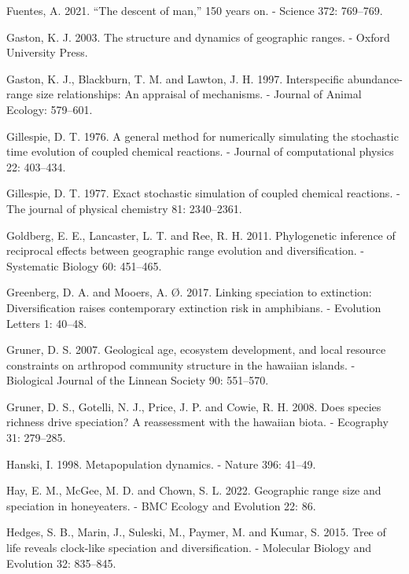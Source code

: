 \documentclass[
  letterpaper,
  DIV=11,
  numbers=noendperiod]{scrartcl}
\newlength{\cslhangindent}
\newenvironment{CSLReferences}[2] %
 {\begin{list}{}{%
  \setlength{\itemindent}{0pt}
  \setlength{\leftmargin}{0pt}
  \setlength{\parsep}{0pt}
  \ifodd #1
   \setlength{\leftmargin}{\cslhangindent}
   \setlength{\itemindent}{-1\cslhangindent}
  \fi
  \setlength{\itemsep}{#2\baselineskip}}}
 {\end{list}}
\begin{document}
\begin{CSLReferences}{1}{1}
Fuentes, A. 2021. {``The descent of man,''} 150 years on. - Science 372:
769--769.

Gaston, K. J. 2003. The structure and dynamics of geographic ranges. -
Oxford University Press.

Gaston, K. J., Blackburn, T. M. and Lawton, J. H. 1997. Interspecific
abundance-range size relationships: An appraisal of mechanisms. -
Journal of Animal Ecology: 579--601.

Gillespie, D. T. 1976. A general method for numerically simulating the
stochastic time evolution of coupled chemical reactions. - Journal of
computational physics 22: 403--434.

Gillespie, D. T. 1977. Exact stochastic simulation of coupled chemical
reactions. - The journal of physical chemistry 81: 2340--2361.

Goldberg, E. E., Lancaster, L. T. and Ree, R. H. 2011. Phylogenetic
inference of reciprocal effects between geographic range evolution and
diversification. - Systematic Biology 60: 451--465.

Greenberg, D. A. and Mooers, A. Ø. 2017. Linking speciation to
extinction: Diversification raises contemporary extinction risk in
amphibians. - Evolution Letters 1: 40--48.

Gruner, D. S. 2007. Geological age, ecosystem development, and local
resource constraints on arthropod community structure in the hawaiian
islands. - Biological Journal of the Linnean Society 90: 551--570.

Gruner, D. S., Gotelli, N. J., Price, J. P. and Cowie, R. H. 2008. Does
species richness drive speciation? A reassessment with the hawaiian
biota. - Ecography 31: 279--285.

Hanski, I. 1998. Metapopulation dynamics. - Nature 396: 41--49.

Hay, E. M., McGee, M. D. and Chown, S. L. 2022. Geographic range size
and speciation in honeyeaters. - BMC Ecology and Evolution 22: 86.

Hedges, S. B., Marin, J., Suleski, M., Paymer, M. and Kumar, S. 2015.
Tree of life reveals clock-like speciation and diversification. -
Molecular Biology and Evolution 32: 835--845.


\end{CSLReferences}
\end{document}
